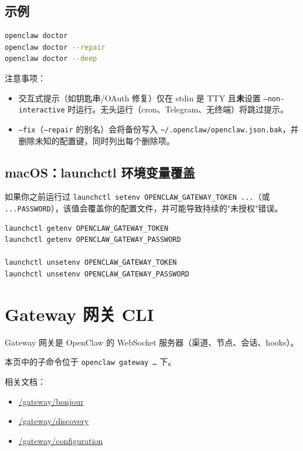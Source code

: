 \subsection{示例}


\begin{lstlisting}[language=bash]
openclaw doctor
openclaw doctor --repair
openclaw doctor --deep
\end{lstlisting}


注意事项：

\begin{itemize}
  \item 交互式提示（如钥匙串/OAuth 修复）仅在 stdin 是 TTY 且\textbf{未}设置 \texttt{--non-interactive} 时运行。无头运行（cron、Telegram、无终端）将跳过提示。
  \item \texttt{--fix}（\texttt{--repair} 的别名）会将备份写入 \texttt{\textasciitilde{}/.openclaw/openclaw.json.bak}，并删除未知的配置键，同时列出每个删除项。
\end{itemize}


\subsection{macOS：launchctl 环境变量覆盖}


如果你之前运行过 \texttt{launchctl setenv OPENCLAW\_GATEWAY\_TOKEN ...}（或 \texttt{...PASSWORD}），该值会覆盖你的配置文件，并可能导致持续的"未授权"错误。

\begin{lstlisting}[language=bash]
launchctl getenv OPENCLAW_GATEWAY_TOKEN
launchctl getenv OPENCLAW_GATEWAY_PASSWORD

launchctl unsetenv OPENCLAW_GATEWAY_TOKEN
launchctl unsetenv OPENCLAW_GATEWAY_PASSWORD
\end{lstlisting}



\clearpage

\section{Gateway 网关 CLI}


Gateway 网关是 OpenClaw 的 WebSocket 服务器（渠道、节点、会话、hooks）。

本页中的子命令位于 \texttt{openclaw gateway …} 下。

相关文档：

\begin{itemize}
  \item \href{/gateway/bonjour}{/gateway/bonjour}
  \item \href{/gateway/discovery}{/gateway/discovery}
  \item \href{/gateway/configuration}{/gateway/configuration}
\end{itemize}


